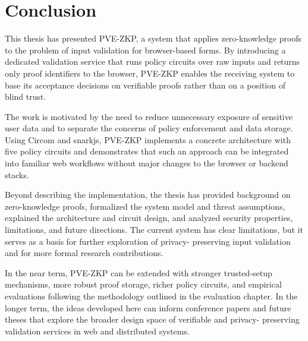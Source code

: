 
\chapter{Conclusion}

This thesis has presented PVE-ZKP, a system that applies zero-knowledge proofs
to the problem of input validation for browser-based forms. By introducing a
dedicated validation service that runs policy circuits over raw inputs and
returns only proof identifiers to the browser, PVE-ZKP enables the receiving
system to base its acceptance decisions on verifiable proofs rather than on a
position of blind trust.

The work is motivated by the need to reduce unnecessary exposure of sensitive
user data and to separate the concerns of policy enforcement and data storage.
Using Circom and snarkjs, PVE-ZKP implements a concrete architecture with five
policy circuits and demonstrates that such an approach can be integrated into
familiar web workflows without major changes to the browser or backend stacks.

Beyond describing the implementation, the thesis has provided background on
zero-knowledge proofs, formalized the system model and threat assumptions,
explained the architecture and circuit design, and analyzed security
properties, limitations, and future directions. The current system has clear
limitations, but it serves as a basis for further exploration of privacy-
preserving input validation and for more formal research contributions.

In the near term, PVE-ZKP can be extended with stronger trusted-setup
mechanisms, more robust proof storage, richer policy circuits, and empirical
evaluations following the methodology outlined in the evaluation chapter. In
the longer term, the ideas developed here can inform conference papers and
future theses that explore the broader design space of verifiable and privacy-
preserving validation services in web and distributed systems.
